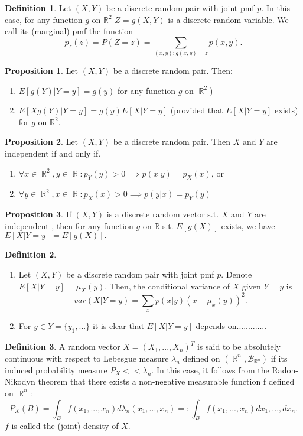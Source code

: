 \documentclass[11pt]{article}
\theoremstyle{definition}
\DeclareMathOperator{\R}{\mathbb{R}}
\newtheorem{prop}{Proposition}
\newtheorem{defn}{Definition}
\begin{document}
\begin{defn}
Let $(X,Y)$ be a discrete random pair with joint pmf $p$. In this case, for any function $g$ on $\mathbb{R}^2$ $Z=g(X,Y)$ is a discrete random variable. We call its (marginal) pmf the function 
\[p_z(z)=P(Z=z)=\sum_{(x,y): g(x,y)=z}p(x,y).\]
\end{defn}

\begin{prop}
Let $(X,Y)$ be a discrete random pair. Then:
\begin{enumerate}
\item $E[g(Y)|Y=y]=g(y)$ for any function $g$ on $\R^2$)
\item $E[Xg(Y)|Y=y]=g(y)E[X|Y=y]$ (provided that $E[X|Y=y]$ exists) for $g$ on $\mathbb{R}^2$.
\end{enumerate}
\end{prop}

\begin{prop}
Let $(X,Y)$ be a discrete random pair. Then $X$ and $Y$ are independent if and only if.
\begin{enumerate}
\item $\forall x\in\R^2,y\in\R: p_Y(y)>0 \implies p(x|y)=p_X(x)$, or
\item $\forall y\in\R^2,x\in\R: p_X(x)>0 \implies p(y|x)=p_Y(y)$
\end{enumerate}
\end{prop}

\begin{prop}
If $(X,Y)$ is a discrete random vector s.t. $X$ and $Y$ are independent , then for any function $g$ on $\mathbb{R}$ s.t. $E[g(X)]$ exists, we have $E[X|Y=y]=E[g(X)].$ 
\end{prop}

\begin{defn}
\begin{enumerate}
\item Let $(X,Y)$ be a discrete random pair with joint pmf $p$. Denote $E[X|Y=y]=\mu_X(y)$. Then, the conditional variance of $X$ given $Y=y$ is 
\[var(X|Y=y)=\sum_x p(x|y)(x-\mu_x(y))^2.\]
\item For $y\in Y=\{y_1,...\}$ it is clear that $E[X|Y=y]$ depends on.............
\end{enumerate}
\end{defn}

\begin{defn}
A random vector $X=(X_1,...,X_n)^T$ is said to be absolutely continuous with respect to Lebesgue measure $\lambda_n$ defined on $(\R^n,\mathcal{B}_{\R^n})$ if its induced probability measure $P_X<<\lambda_n$.
In this case, it follows from the Radon-Nikodyn theorem that there exists a non-negative measurable function f defined on $\R^n$:
\[P_X(B)=\int_B f(x_1,...,x_n)d\lambda_n(x_1,...,x_n)=:\int_B f(x_1,...,x_n)dx_1,...,dx_n.\]
$f$ is called the (joint) density of $X$.
\end{defn}
\end{document}
